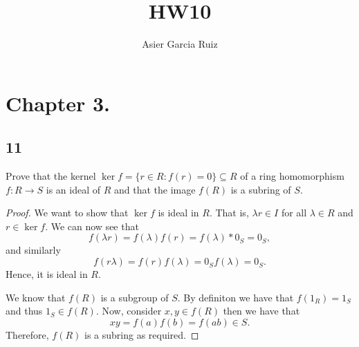 \documentclass{article}
\title{HW10}
\author{Asier Garcia Ruiz}
\newenvironment{hwproof}[1]
{
    #1
    \begin{proof}
}{
    \end{proof}
}
\begin{document}
\maketitle

\section*{Chapter 3.}
\subsection*{11}
\begin{hwproof}
    {
        Prove that the kernel $\ker f = \{r \in R : f(r) = 0\} \subseteq R$ of
        a ring homomorphism $f: R \to S$ is an ideal of $R$ and that the image
        $f(R)$ is a subring of $S$.
    }
    We want to show that $\ker f$ is ideal in $R$. That is, $\lambda r \in I$ for
    all $\lambda \in R$ and $r \in \ker f$. We can now see that
    \begin{equation*}
        f(\lambda r) = f(\lambda)f(r) = f(\lambda)*0_S = 0_S,
    \end{equation*}
    and similarly
    \begin{equation*}
        f(r\lambda) = f(r)f(\lambda) = 0_S f(\lambda) = 0_S.
    \end{equation*}
    Hence, it is ideal in $R$.

    We know that $f(R)$ is a subgroup of $S$. By definiton we have that
    $f(1_R) = 1_S$ and thus $1_S \in f(R)$. Now, consider $x,y \in f(R)$
    then we have that
    \begin{equation*}
        xy = f(a)f(b) = f(ab) \in S.
    \end{equation*}
    Therefore, $f(R)$ is a subring as required.
\end{hwproof}
\end{document}

